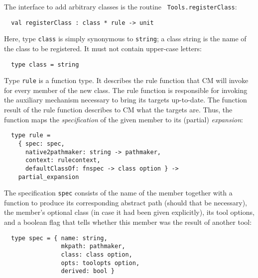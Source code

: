 The interface to add arbitrary classes is the routine {\tt
Tools.registerClass}:

\begin{lstlisting}
  val registerClass : class * rule -> unit
\end{lstlisting}%

Here, type {\tt class} is simply synonymous to {\tt string}; a class
string is the name of the class to be registered.  It must not contain
upper-case letters:

\begin{lstlisting}
  type class = string
\end{lstlisting}%

Type {\tt rule} is a function type.  It describes the rule function
that CM will invoke for every member of the new class. The rule
function is responsible for invoking the auxiliary mechanism necessary
to bring its targets up-to-date.  The function result of the rule
function describes to CM what the targets are.  Thus, the function
maps the {\em specification} of the given member to its (partial) {\em
expansion}:

\begin{lstlisting}
  type rule =
    { spec: spec,
      native2pathmaker: string -> pathmaker,
      context: rulecontext,
      defaultClassOf: fnspec -> class option } ->
    partial_expansion
\end{lstlisting}%

The specification {\tt spec} consists of the name of the member
together with a function to produce its corresponding abstract
path (should that be necessary), the member's optional class (in case
it had been given explicitly), its tool options, and a boolean flag
that tells whether this member was the result of another tool:

\begin{lstlisting}
  type spec = { name: string,
                mkpath: pathmaker,
                class: class option,
                opts: toolopts option,
                derived: bool }
\end{lstlisting}%

